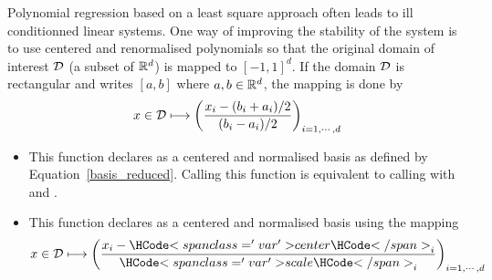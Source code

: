 Polynomial regression based on a least square approach often leads to ill
conditionned linear systems. One way of improving the stability of the system is to
use centered and renormalised polynomials so that the original domain of interest
${\mathcal D}$ (a subset of ${\mathbb R}^d$) is mapped to $[-1,1]^d$. If the domain ${\mathcal D}$ is
rectangular and writes $[a, b]$ where $a,b \in {\mathbb R}^d$, the mapping is done by 
\begin{equation}
  \label{basis_reduced}
  x \in {\mathcal D} \longmapsto \left(\frac{x_i - (b_i+a_i)/2}{(b_i - a_i)/2}
  \right)_{i=1,\cdots,d}
\end{equation}
\begin{itemize}
\item {}
  \sshortdescribe This function declares  as a centered and normalised basis
  as defined by Equation~\ref{basis_reduced}. Calling this function is equivalent to
  calling  with  and
  .
\item {}
  \sshortdescribe This function declares  as a centered and normalised basis
  using the mapping
  \begin{equation*}
    x \in \cD \longmapsto \left(\frac{x_i - \var{center}_i }{\var{scale}_i}
    \right)_{i=1,\cdots,d}
  \end{equation*}
\end{itemize}


